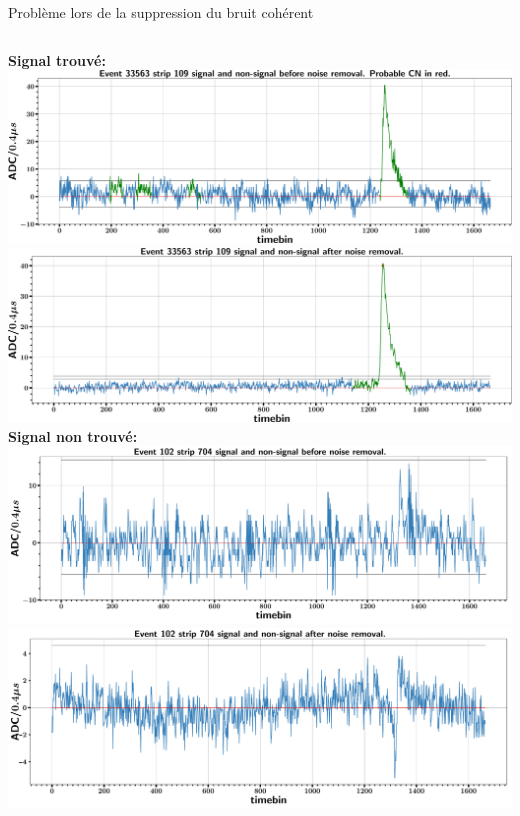     \begin{frame}{Problème lors de la suppression du bruit cohérent}
        
        \begin{scriptsize}
            \begin{columns}
                \begin{column}{0.45\textwidth}
                    \centering \textbf{Signal trouvé:}\\
                    \centering \includegraphics[width=\textwidth]{./pictures/good_pedsub.png}\\
                    \centering \includegraphics[width=\textwidth]{./pictures/good_cnsub.png}\\
                    \centering \textbf{Signal non trouvé:}\\
                    \centering \includegraphics[width=\textwidth]{./pictures/pedsub_adcs_high_threshold.pdf}\\
                    \centering \includegraphics[width=\textwidth]{./pictures/cnsub_adcs_high_threshold.pdf}\\

\end{column}
\end{columns}
\end{scriptsize}
\end{frame}
